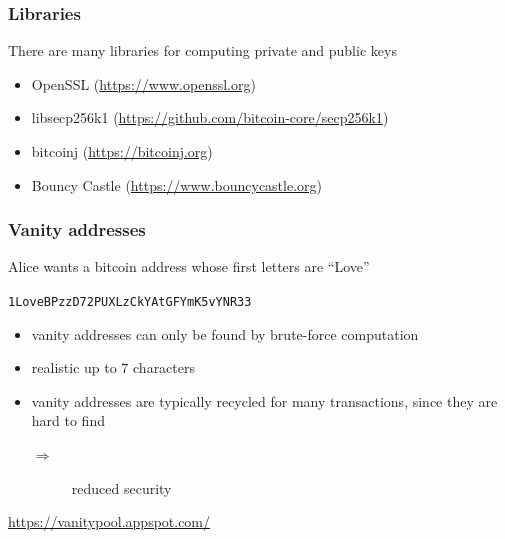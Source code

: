 \documentclass[11pt]{beamer}  %
\begin{document}
\begin{frame}\frametitle{Libraries}

  \begin{greenbox}{There are many libraries for computing private and public keys}
  \begin{itemize}
  \item OpenSSL (\url{https://www.openssl.org})
  \item libsecp256k1 (\url{https://github.com/bitcoin-core/secp256k1})
  \item bitcoinj (\url{https://bitcoinj.org})
  \item Bouncy Castle (\url{https://www.bouncycastle.org})
  \end{itemize}
  \end{greenbox}

\end{frame}

\begin{frame}\frametitle{Vanity addresses}

  \begin{greenbox}{Alice wants a bitcoin address whose first letters are ``Love''}
  \begin{center}
    \texttt{1\alert{Love}BPzzD72PUXLzCkYAtGFYmK5vYNR33}
  \end{center}
  \end{greenbox}

  \bigskip

  \begin{itemize}
  \item vanity addresses can only be found by brute-force computation
  \item realistic up to $7$ characters
  \item vanity addresses are typically recycled for many transactions, since
    they are hard to find
    \begin{description}
      \item[$\Rightarrow$] reduced security
    \end{description}
  \end{itemize}

  \bigskip

  \begin{center}
    \url{https://vanitypool.appspot.com/}
  \end{center}

\end{frame}
\end{document}
